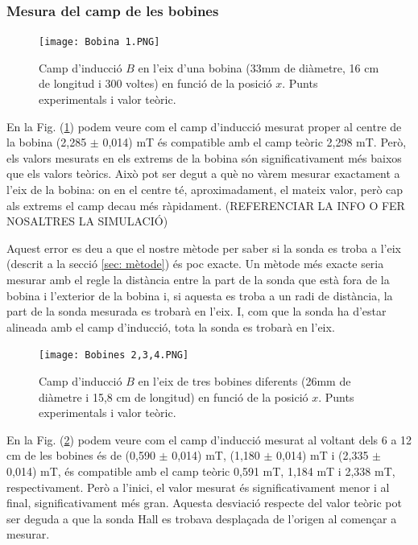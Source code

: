 \documentclass[11pt]{article}
\numberwithin{equation}{section}
\numberwithin{figure}{section}
\numberwithin{table}{section}
\begin{document}
\subsubsection{Mesura del camp de les bobines}\label{subsec: bobines}

\begin{figure}[H]
    \centering
    \texttt{[image: Bobina 1.PNG]}
    \caption{Camp d'inducció $B$ en l'eix d'una bobina (33mm de diàmetre, 16 cm de longitud i 300 voltes) en funció de la posició $x$. Punts experimentals i valor teòric.}
    \label{fig: BvsX_33mm}
\end{figure}

En la Fig. (\ref{fig: BvsX_33mm}) podem veure com el camp d'inducció mesurat proper al centre de la bobina (2,285 $\pm$ 0,014) mT és compatible amb el camp teòric 2,298 mT. Però, els valors mesurats en els extrems de la bobina són significativament més baixos que els valors teòrics. Això pot ser degut a què no vàrem mesurar exactament a l'eix de la bobina: on en el centre té, aproximadament, el mateix valor, però cap als extrems el camp decau més ràpidament. (REFERENCIAR LA INFO O FER NOSALTRES LA SIMULACIÓ)

Aquest error es deu a que el nostre mètode per saber si la sonda es troba a l'eix (descrit a la secció \ref{sec: mètode}) és poc exacte. Un mètode més exacte seria mesurar amb el regle la distància entre la part de la sonda que està fora de la bobina i l'exterior de la bobina i, si aquesta es troba a un radi de distància, la part de la sonda mesurada es trobarà en l'eix. I, com que la sonda ha d'estar alineada amb el camp d'inducció, tota la sonda es trobarà en l'eix.

\begin{figure}[H]
    \centering
    \texttt{[image: Bobines 2,3,4.PNG]}
    \caption{Camp d'inducció $B$ en l'eix de tres bobines diferents (26mm de diàmetre i 15,8 cm de longitud) en funció de la posició $x$. Punts experimentals i valor teòric.}
    \label{fig: BvsX_26mm}
\end{figure}

En la Fig. (\ref{fig: BvsX_26mm}) podem veure com el camp d'inducció mesurat al voltant dels 6 a 12 cm de les bobines és de (0,590 $\pm$ 0,014) mT, (1,180 $\pm$ 0,014) mT i (2,335 $\pm$ 0,014) mT, és compatible amb el camp teòric 0,591 mT, 1,184 mT i 2,338 mT, respectivament. Però a l'inici, el valor mesurat és significativament menor i al final, significativament més gran. Aquesta desviació respecte del valor teòric pot ser deguda a que la sonda Hall es trobava desplaçada de l'origen al començar a mesurar.
\end{document}
